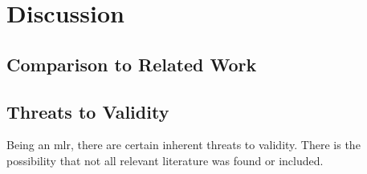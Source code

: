 \chapter{Discussion}
\section{Comparison to Related Work}
\section{Threats to Validity}
Being an \acrshort{mlr}, there are certain inherent threats to validity.
There is the possibility that not all relevant literature was found or included.